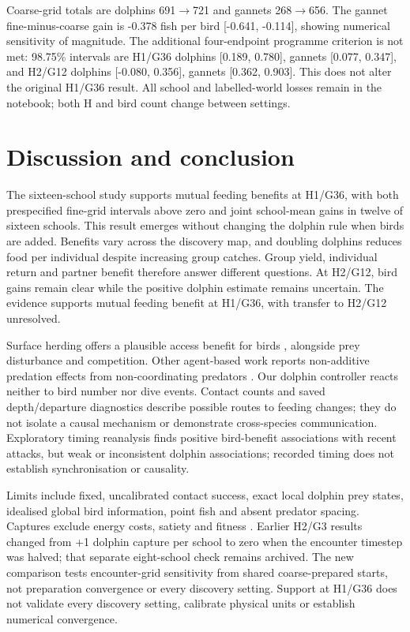\documentclass[10pt,a4paper,twocolumn]{article}
\begin{document}
Coarse-grid totals are dolphins 691\ensuremath{\rightarrow}721 and gannets 268\ensuremath{\rightarrow}656. The gannet fine-minus-coarse gain is -0.378 fish per bird [-0.641, -0.114], showing numerical sensitivity of magnitude. The additional four-endpoint programme criterion is not met: 98.75\% intervals are H1/G36 dolphins [0.189, 0.780], gannets [0.077, 0.347], and H2/G12 dolphins [-0.080, 0.356], gannets [0.362, 0.903]. This does not alter the original H1/G36 result. All school and labelled-world losses remain in the notebook; both H and bird count change between settings.

\section{Discussion and conclusion}
The sixteen-school study supports mutual feeding benefits at H1/G36, with both prespecified fine-grid intervals above zero and joint school-mean gains in twelve of sixteen schools. This result emerges without changing the dolphin rule when birds are added. Benefits vary across the discovery map, and doubling dolphins reduces food per individual despite increasing group catches. Group yield, individual return and partner benefit therefore answer different questions. At H2/G12, bird gains remain clear while the positive dolphin estimate remains uncertain. The evidence supports mutual feeding benefit at H1/G36, with transfer to H2/G12 unresolved.

Surface herding offers a plausible access benefit for birds \citep{odonoghue2009,thiebault2016,licht2026}, alongside prey disturbance and competition. Other agent-based work reports non-additive predation effects from non-coordinating predators \citep{mohapatra2025}. Our dolphin controller reacts neither to bird number nor dive events. Contact counts and saved depth/departure diagnostics describe possible routes to feeding changes; they do not isolate a causal mechanism or demonstrate cross-species communication. Exploratory timing reanalysis finds positive bird-benefit associations with recent attacks, but weak or inconsistent dolphin associations; recorded timing does not establish synchronisation or causality.

Limits include fixed, uncalibrated contact success, exact local dolphin prey states, idealised global bird information, point fish and absent predator spacing. Captures exclude energy costs, satiety and fitness \citep{thiebault2016,licht2026,stockin2022}. Earlier H2/G3 results changed from +1 dolphin capture per school to zero when the encounter timestep was halved; that separate eight-school check remains archived. The new comparison tests encounter-grid sensitivity from shared coarse-prepared starts, not preparation convergence or every discovery setting. Support at H1/G36 does not validate every discovery setting, calibrate physical units or establish numerical convergence.
\end{document}
